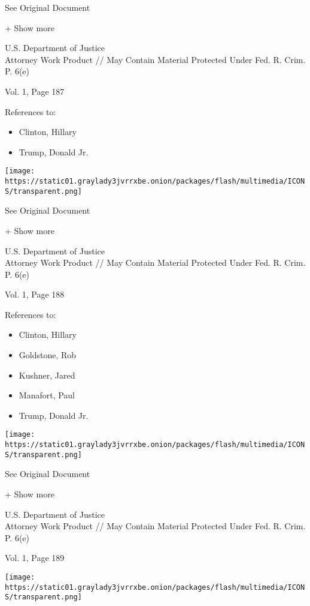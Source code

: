 See Original Document

+ Show more

U.S. Department of Justice\\
Attorney Work Product // May Contain Material Protected Under Fed. R.
Crim. P. 6(e)

Vol. 1, Page 187

References to:

\begin{itemize}
\tightlist
\item
  Clinton, Hillary
\item
  Trump, Donald Jr.
\end{itemize}

\protect\hyperlink{}{}

\texttt{[image: https://static01.graylady3jvrrxbe.onion/packages/flash/multimedia/ICONS/transparent.png]}

See Original Document

+ Show more

U.S. Department of Justice\\
Attorney Work Product // May Contain Material Protected Under Fed. R.
Crim. P. 6(e)

Vol. 1, Page 188

References to:

\begin{itemize}
\tightlist
\item
  Clinton, Hillary
\item
  Goldstone, Rob
\item
  Kushner, Jared
\item
  Manafort, Paul 
\item
  Trump, Donald Jr.
\end{itemize}

\protect\hyperlink{}{}

\texttt{[image: https://static01.graylady3jvrrxbe.onion/packages/flash/multimedia/ICONS/transparent.png]}

See Original Document

+ Show more

U.S. Department of Justice\\
Attorney Work Product // May Contain Material Protected Under Fed. R.
Crim. P. 6(e)

Vol. 1, Page 189

\protect\hyperlink{}{}

\texttt{[image: https://static01.graylady3jvrrxbe.onion/packages/flash/multimedia/ICONS/transparent.png]}

